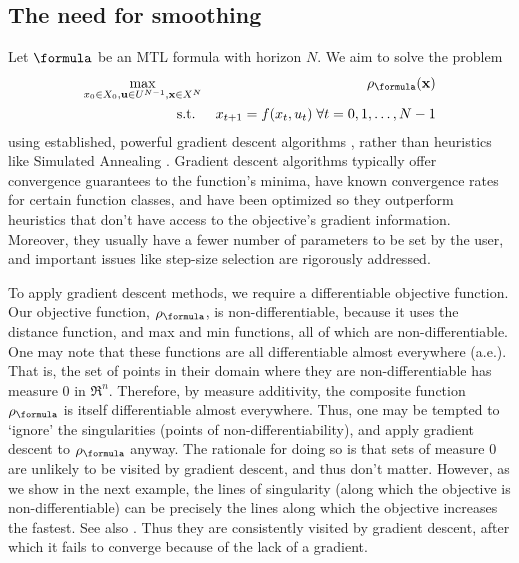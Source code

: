 \subsection{The need for smoothing}
\label{sec:need for smoothing}
Let $\formula$ be an MTL formula with horizon $N$.
We aim to solve the problem
\begin{eqnarray}
\label{eq:min rob problem}
\max_{x_0 \in X_0, \inpSig \in \inpSet^{N-1}, \sstraj \in X^N} && \robf(\sstraj)
\nonumber
\\
\text{s.t. } && x_{t+1} = f(x_t,u_t) \; \forall t=0,1,\ldots,N-1
\end{eqnarray}
using established, powerful gradient descent algorithms \cite{Polak97_Optim}, rather than heuristics like Simulated Annealing \cite{kirkpatrickV_SA83}.
Gradient descent algorithms typically offer convergence guarantees to the function's minima, have known convergence rates for certain function classes, and have been optimized so they outperform heuristics that don't have access to the objective's gradient information.
Moreover, they usually have a fewer number of parameters to be set by the user, and important issues like step-size selection are rigorously addressed.

To apply gradient descent methods, we require a differentiable objective function. 
Our objective function, $\robf$, is non-differentiable, because it uses the distance function, and max and min functions, all of which are non-differentiable.
One may note that these functions are all differentiable almost everywhere (a.e.).
That is, the set of points in their domain where they are non-differentiable has measure 0 in $\Re^n$. 
Therefore, by measure additivity, the composite function $\robf$ is itself differentiable almost everywhere.
Thus, one may be tempted to `ignore' the singularities (points of non-differentiability), and apply gradient descent to $\robf$ anyway.
The rationale for doing so is that sets of measure 0 are unlikely to be visited by gradient descent, and thus don't matter. 
However, as we show in the next example, the lines of singularity (along which the objective is non-differentiable) can be  precisely the lines along which the objective increases the fastest.
See also \cite{Cortes08_Discontinuous}.
Thus they are consistently visited by gradient descent, after which it fails to converge because of the lack of a gradient.


